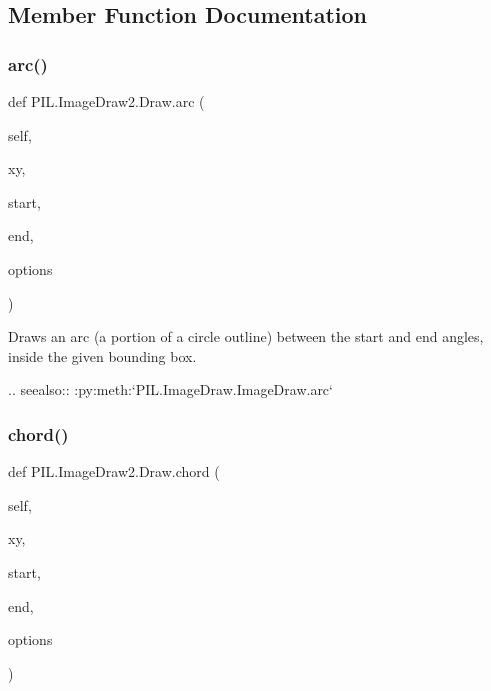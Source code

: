\subsection{Member Function Documentation}
\mbox{\label{classPIL_1_1ImageDraw2_1_1Draw_a807aafe7a641f7abfea1733f31fe5427}} 
\subsubsection{\texorpdfstring{arc()}{arc()}}
{\footnotesize\ttfamily def P\+I\+L.\+Image\+Draw2.\+Draw.\+arc (\begin{DoxyParamCaption}\item[{}]{self,  }\item[{}]{xy,  }\item[{}]{start,  }\item[{}]{end,  }\item[{}]{options }\end{DoxyParamCaption})}

\begin{DoxyVerb}Draws an arc (a portion of a circle outline) between the start and end
angles, inside the given bounding box.

.. seealso:: :py:meth:`PIL.ImageDraw.ImageDraw.arc`
\end{DoxyVerb}
 \mbox{\label{classPIL_1_1ImageDraw2_1_1Draw_ab042f3845a6707d8b5f5092e9a8d2e67}} 
\subsubsection{\texorpdfstring{chord()}{chord()}}
{\footnotesize\ttfamily def P\+I\+L.\+Image\+Draw2.\+Draw.\+chord (\begin{DoxyParamCaption}\item[{}]{self,  }\item[{}]{xy,  }\item[{}]{start,  }\item[{}]{end,  }\item[{}]{options }\end{DoxyParamCaption})}


